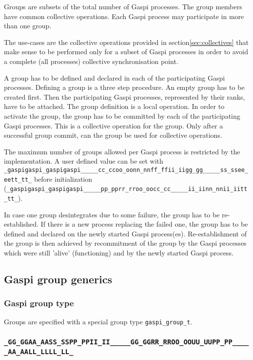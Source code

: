 \documentclass[a4paper]{article}
\makeatletter
\newcommand{\secref}[1]{section\xspace\ref{#1}}
\newlength{\st}\setlength{\st}{0pt}
\newcommand{\zerowsep}{\hskip 0pt plus 0.1pt minus 0.1pt}
\newcommand{\ZSEP}[1]{\ifx#1\@@@EOZ@@@\let\next\relax\else\ifx#1\_#1\zerowsep\else#1\fi\let\next\ZSEP\fi\next}
\newcommand{\zsep}[1]{\ZSEP{}#1\@@@EOZ@@@}
\newcommand{\gaspiprefix}{gaspi}
\newcommand{\GASPI}{{\sc Gaspi}}
\newcommand{\function}[1]{{\tt #1}}
\newcommand{\gaspifunction}[1]{\function{\protect\zsep{\gaspiprefix\_#1}}}
\newcommand{\GASPIGROUPALL}{{\tt\protect\zsep{GASPI\_GROUP\_ALL}}}
\makeatother
\begin{document}
Groups are subsets of the total number of \GASPI{} processes. The group members
have common collective operations.  Each \GASPI{} process may participate in more
than one group.

The use-cases are the collective operations provided in \secref{sec:collectives}
that make sense to be performed only for a subset of \GASPI{} processes
in order to avoid a complete (all processes) collective synchronisation
point.

A group has to be defined and declared in each of the participating
\GASPI{} processes. Defining a group is a three step procedure.  An
empty group has to be created first. Then the participating \GASPI{}
processes, represented by their ranks, have to be attached. The group
definition is a local operation.  In order to activate the group, the
group has to be committed by each of the participating \GASPI{}
processes. This is a collective operation for the group. Only after a
successful group commit, can the group be used for collective
operations.

The maximum number of groups allowed per \GASPI{} process is
restricted by the implementation. A user defined value can be set with
\gaspifunction{config\_set} before initialization
(\gaspifunction{proc\_init}).

In case one group desintegrates due to some failure, the group has to
be re-established. If there is a new process replacing the failed one,
the group has to be defined and declared on the newly started \GASPI{}
process(es).  Re-establishment of the group is then achieved by
recommitment of the group by the \GASPI{} processes which were still
'alive' (functioning) and by the newly started \GASPI{} process.

\subsection{\GASPI{} group generics}

\subsubsection{\GASPI{} group type}

Groups are specified with a special group type \verb|gaspi_group_t|.

\subsubsection{\GASPIGROUPALL{}}
\end{document}
